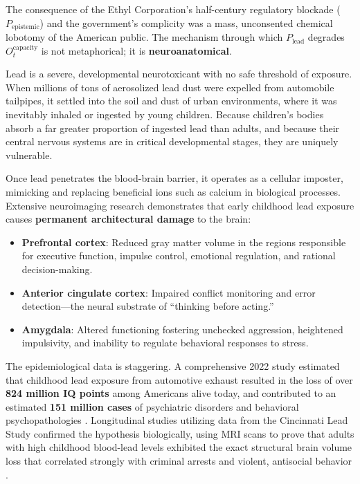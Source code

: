 \documentclass[12pt,openany]{book}
\providecommand{\tightlist}{\setlength{\itemsep}{0pt}\setlength{\parskip}{0pt}}
\begin{document}
The consequence of the Ethyl Corporation's half-century regulatory blockade ($P_{\text{epistemic}}$) and the government's complicity was a mass, unconsented chemical lobotomy of the American public. The mechanism through which $P_{\text{lead}}$ degrades $O_t^{\text{capacity}}$ is not metaphorical; it is \textbf{neuroanatomical}.

Lead is a severe, developmental neurotoxicant with no safe threshold of exposure. When millions of tons of aerosolized lead dust were expelled from automobile tailpipes, it settled into the soil and dust of urban environments, where it was inevitably inhaled or ingested by young children. Because children's bodies absorb a far greater proportion of ingested lead than adults, and because their central nervous systems are in critical developmental stages, they are uniquely vulnerable.

Once lead penetrates the blood-brain barrier, it operates as a cellular imposter, mimicking and replacing beneficial ions such as calcium in biological processes. Extensive neuroimaging research demonstrates that early childhood lead exposure causes \textbf{permanent architectural damage} to the brain:
\begin{itemize}
\tightlist
\item \textbf{Prefrontal cortex}: Reduced gray matter volume in the regions responsible for executive function, impulse control, emotional regulation, and rational decision-making.
\item \textbf{Anterior cingulate cortex}: Impaired conflict monitoring and error detection---the neural substrate of ``thinking before acting.''
\item \textbf{Amygdala}: Altered functioning fostering unchecked aggression, heightened impulsivity, and inability to regulate behavioral responses to stress.
\end{itemize}

The epidemiological data is staggering. A comprehensive 2022 study estimated that childhood lead exposure from automotive exhaust resulted in the loss of over \textbf{824 million IQ points} among Americans alive today, and contributed to an estimated \textbf{151 million cases} of psychiatric disorders and behavioral psychopathologies \cite{tel_iq_loss}. Longitudinal studies utilizing data from the Cincinnati Lead Study confirmed the hypothesis biologically, using MRI scans to prove that adults with high childhood blood-lead levels exhibited the exact structural brain volume loss that correlated strongly with criminal arrests and violent, antisocial behavior \cite{tel_cincinnati}.
\end{document}
